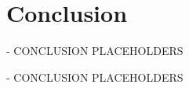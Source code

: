 \chapter{Conclusion}\label{ch:conclusion}


\begin{tcolorbox}[colback=orange]
- CONCLUSION PLACEHOLDERS
\vspace{20cm}

\end{tcolorbox}
\begin{tcolorbox}[colback=orange]
- CONCLUSION PLACEHOLDERS
\vspace{20cm}

\end{tcolorbox}
